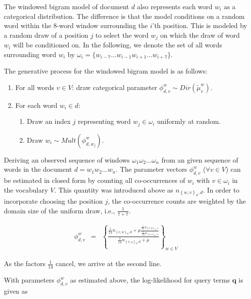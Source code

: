 \documentclass[]{article}
\begin{document}
The windowed bigram model of document $d$ also represents each word
$w_{i}$ as a categorical distribution. The difference is that the
model conditions on a random word within the 8-word window surrounding
 the $i$'th position. This is modeled by a random
draw of a position $j$ to select the word $w_{j}$ on which the draw
of word $w_{i}$ will be conditioned on. In the following, we denote
the set of all words surrounding word $w_{i}$ by $\omega_{i}=\{w_{i-7}\dots w_{i-1}w_{i+1}\dots w_{i+7}\}$.

The generative process for the windowed bigram model is as follows:
\begin{enumerate}[leftmargin=4mm]
\item For all words $v\in V$: draw categorical parameter $\phi_{d,v}^{w}\sim Dir(\tilde{\mu}_{v}^{w})$.
\item For each word $w_{i}\in d$: 

\begin{enumerate}[leftmargin=4mm]
\item Draw an index $j$ representing word $w_{j}\in\omega_{i}$ uniformly
at random.
\item Draw $w_{i}\sim Mult(\phi_{d,w_{j}}^{w})$.
\end{enumerate}
\end{enumerate}
Deriving an observed sequence of windows $\omega_{1}\omega_{2}\dots\omega_{n}$
from an given sequence of words in the document $d=w_{1}w_{2}\dots w_{n}$.
The parameter vectors $\phi_{d,v}^{w}$ ($\forall v\in V$) can be
estimated in closed form by counting all co-occurrences of $w_{i}$
with $v\in\omega_{i}$ in the vocabulary $V$. This quantity was introduced
above as $n_{\left\{ w,v\right\} _{8},d}$. In order to incorporate
choosing the position $j$, the co-occurrence counts are weighted
by the domain size of the uniform draw, i.e., $\frac{1}{7+7}$. 

\begin{eqnarray*}
\phi_{d,v}^{w} & = & \left\{ \frac{\frac{1}{14}n_{\left\{ v,w\right\} _{8},d}+\mu\frac{\frac{1}{14}n_{\left\{ v,w\right\} _{8},\star}}{\frac{1}{14}n_{\left\{ v,\star\right\} _{8},\star}}}{\frac{1}{14}n_{\left\{ v,\star\right\} _{8},d}+\mu}\right\} _{w\in V}
\end{eqnarray*}

As the factors $\frac{1}{14}$ cancel, we arrive at the second line.

With parameters $\phi_{d,v}^{w}$ as estimated above, the log-likelihood
for query terms $\mathbf{q}$ is given as
\end{document}
